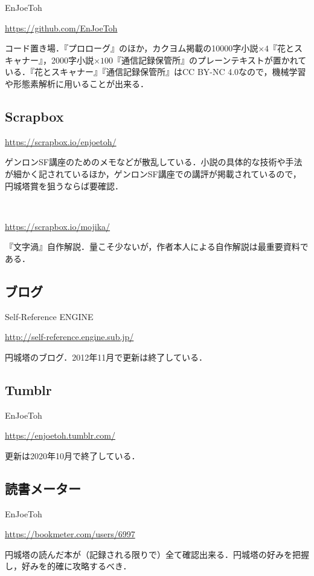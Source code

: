 \documentclass[10pt, a5paper, twoside]{jsarticle}
\theoremstyle{definition}
\begin{document}
			EnJoeToh

			\url{https://github.com/EnJoeToh}

			コード置き場．『プロローグ』のほか，カクヨム掲載の10000字小説$\times 4$『花とスキャナー』，2000字小説$\times 100$『通信記録保管所』のプレーンテキストが置かれている．『花とスキャナー』『通信記録保管所』はCC BY-NC 4.0なので，機械学習や形態素解析に用いることが出来る．

		\subsection{Scrapbox}

			\url{https://scrapbox.io/enjoetoh/}

			ゲンロンSF講座のためのメモなどが散乱している．小説の具体的な技術や手法が細かく記されているほか，ゲンロンSF講座での講評が掲載されているので，円城塔賞を狙うならば要確認．

			~

			\url{https://scrapbox.io/mojika/}

			『文字渦』自作解説．量こそ少ないが，作者本人による自作解説は最重要資料である．

		\subsection{ブログ}

			Self-Reference ENGINE

			\url{http://self-reference.engine.sub.jp/}

			円城塔のブログ．2012年11月で更新は終了している．

		\subsection{Tumblr}

			EnJoeToh

			\url{https://enjoetoh.tumblr.com/}

			更新は2020年10月で終了している．

		\subsection{読書メーター}

			EnJoeToh

			\url{https://bookmeter.com/users/6997}

			円城塔の読んだ本が（記録される限りで）全て確認出来る．円城塔の好みを把握し，好みを的確に攻略するべき．
\end{document}
